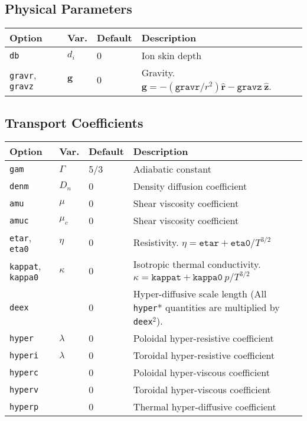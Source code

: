 \documentclass[draft]{book}
\renewcommand{\vec}[1]{\ensuremath{\mathbf{#1}}}
\newcommand{\uvec}[1]{\ensuremath{\vec{\hat{#1}}}}
\begin{document}
\subsection{Physical Parameters}

\begin{tabular}{llll}
  \textbf{Option}&\textbf{Var.}&\textbf{Default}&\textbf{Description}\\
  \hline
  \texttt{db}     & $d_i$   & 0   & Ion skin depth\\
  \texttt{gravr}, \texttt{gravz} & \vec{g} & 0 & \parbox[t]{1.8in}{Gravity.\\
                       $\vec{g} = -(\mathtt{gravr}/r^2) \uvec{r} 
                                  - \mathtt{gravz}\ \uvec{z}$.}
\end{tabular}


\subsection{Transport Coefficients}

\begin{tabular}{llll}
  \textbf{Option}&\textbf{Var.}&\textbf{Default}&\textbf{Description}\\
  \hline
  \texttt{gam}    & $\Gamma$& 5/3 & Adiabatic constant\\
  \texttt{denm}   & $D_n$   & 0   & Density diffusion coefficient\\
  \texttt{amu}    & $\mu$   & 0   & Shear viscosity coefficient\\
  \texttt{amuc}   & $\mu_c$ & 0   & Shear viscosity coefficient\\
  \texttt{etar}, \texttt{eta0}
                  & $\eta$  & 0   & Resistivity.  
                  $\eta = \mathtt{etar} + \mathtt{eta0}/T^{3/2}$\\
  \texttt{kappat}, \texttt{kappa0}
                  & $\kappa$& 0   &  \parbox[t]{1.9in}
	          {Isotropic thermal conductivity.\\
                  $\kappa = \mathtt{kappat} + \mathtt{kappa0}\ p/T^{3/2}$}\\
  \texttt{deex}   & & 0 & \parbox[t]{1.9in}{Hyper-diffusive scale length\\
    (All \texttt{hyper}* quantities are multiplied by \texttt{deex}$^2$).}\\
  \texttt{hyper}  & $\lambda$ & 0 & Poloidal hyper-resistive coefficient\\
  \texttt{hyperi} & $\lambda$ & 0 & Toroidal hyper-resistive coefficient\\
  \texttt{hyperc} & & 0 & Poloidal hyper-viscous coefficient\\
  \texttt{hyperv} & & 0 & Toroidal hyper-viscous coefficient\\
  \texttt{hyperp} & & 0 & Thermal hyper-diffusive coefficient\\
\end{tabular}
\end{document}
